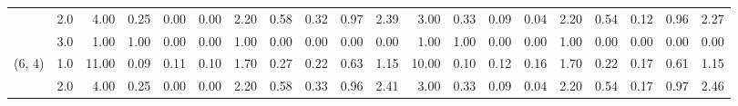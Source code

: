 \begin{tabular}{llrrrrrrrrrrrrrrrrrr}
       & 2.0 &               4.00 &                     0.25 &                                 0.00 &                             0.00 &                           2.20 &                                               0.58 &                                            0.32 &                                            0.97 &                                        2.39 &               3.00 &                     0.33 &                                 0.09 &                             0.04 &                           2.20 &                                               0.54 &                                            0.12 &                                            0.96 &                                        2.27 \\
       & 3.0 &               1.00 &                     1.00 &                                 0.00 &                             0.00 &                           1.00 &                                               0.00 &                                            0.00 &                                            0.00 &                                        0.00 &               1.00 &                     1.00 &                                 0.00 &                             0.00 &                           1.00 &                                               0.00 &                                            0.00 &                                            0.00 &                                        0.00 \\
(6, 4) & 1.0 &              11.00 &                     0.09 &                                 0.11 &                             0.10 &                           1.70 &                                               0.27 &                                            0.22 &                                            0.63 &                                        1.15 &              10.00 &                     0.10 &                                 0.12 &                             0.16 &                           1.70 &                                               0.22 &                                            0.17 &                                            0.61 &                                        1.15 \\
       & 2.0 &               4.00 &                     0.25 &                                 0.00 &                             0.00 &                           2.20 &                                               0.58 &                                            0.33 &                                            0.96 &                                        2.41 &               3.00 &                     0.33 &                                 0.09 &                             0.04 &                           2.20 &                                               0.54 &                                            0.17 &                                            0.97 &                                        2.46 \\

\end{tabular}
